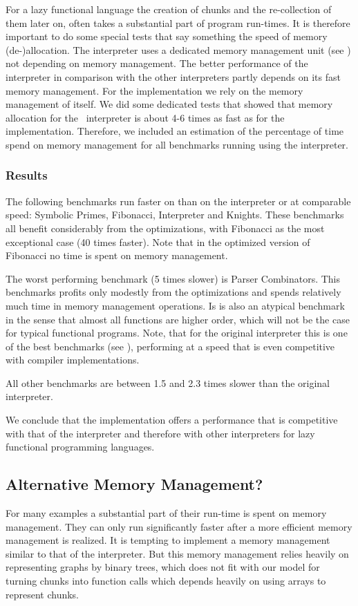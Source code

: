 For a lazy functional language the creation of chunks and the re-collection of them later on, often takes a substantial part of program run-times.
It is therefore important to do some special tests that say something the speed of memory (de-)allocation.
The \Sapl interpreter uses a dedicated memory management unit (see \cite{JKP}) not depending on \Java memory management. 
The better performance of the \Sapl interpreter in comparison with the other interpreters partly depends on its fast memory management.
For the \JS implementation we rely on  the memory management of \JS itself.
We did some dedicated tests that showed that memory allocation for the \Java\ \Sapl interpreter is about 4-6 times as fast as for the \JS implementation.
Therefore, we included an estimation of the percentage of time spend on memory management for all benchmarks running using  the \Sapljs interpreter.

\subsubsection{Results}
The following benchmarks run faster on \Sapljs than on the \Sapl interpreter or at comparable speed: Symbolic Primes, Fibonacci, Interpreter and Knights. These benchmarks all benefit considerably from the optimizations, with Fibonacci as the most exceptional case (40 times faster).
Note that in the optimized version of Fibonacci no time is spent on memory management.

The worst performing benchmark (5 times slower) is Parser Combinators. 
This benchmarks profits only modestly  from the optimizations and spends relatively much time 
in memory management operations. Is is also an atypical benchmark in the sense that almost all functions are higher order, which will not be the case for
typical functional programs. Note, that for the original \Sapl interpreter this is one of the best benchmarks (see \cite{JKP}), 
performing at a speed that is even competitive with compiler implementations. 

All other benchmarks are between 1.5 and 2.3 times slower than the original \Sapl interpreter.

We conclude that  the \Sapljs implementation offers a performance that is competitive with that of the \Sapl interpreter and therefore
with other interpreters for lazy functional programming languages.


\subsection{Alternative Memory Management?}
For many \Sapljs examples a substantial part of their run-time is spent on memory management. 
They can only run significantly faster after a more efficient memory management is realized.
It is tempting to implement a memory management similar to that of the \Sapl interpreter. 
But this memory management relies heavily on representing graphs by binary trees, 
which does not fit with our model for turning chunks into \JS function calls which depends heavily on using arrays to
represent chunks.

